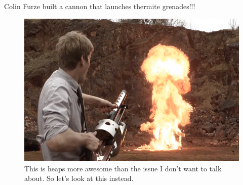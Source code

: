 \documentclass{beamer}
\begin{document}
\begin{frame}{Colin Furze built a cannon that launches thermite grenades!!!}
\begin{figure}
\caption{This is heaps more awesome than the issue I don't want to talk about. So let's look at this instead.}
\includegraphics[scale=.5]{thermite1-720x720.png}
\end{figure}
\end{frame}

\end{document}
